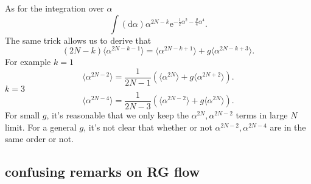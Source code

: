 As for the integration over $\alpha$
\[
	\int (\mathrm{d}\alpha) \alpha^{2N - k} \mathrm{e}^{- \frac{1}{2} \alpha^2 - \frac{g}{4} \alpha^4}
.\] 
The same trick allows us to derive that
\[
	(2N-k) \langle \alpha^{2N-k-1}\rangle = \langle \alpha^{2N-k + 1} \rangle + g \langle \alpha^{2N-k+3} \rangle
.\] 
For example $k=1$
\[
	\langle \alpha^{2N-2} \rangle = \frac{1}{2N-1} (\langle \alpha^{2N} \rangle + g \langle \alpha^{2N+2}\rangle)
.\] 
$k=3$
\[
	\langle \alpha^{2N-4} \rangle = \frac{1}{2N-3}(\langle \alpha^{2N-2} \rangle + g \langle \alpha^{2N} \rangle)
.\] 
For small $g$, it's reasonable that we only keep the $\alpha^{2N},\alpha^{2N-2}$ terms in large $N$ limit.
For a general $g$, it's not clear that whether or not $\alpha^{2N-2},\alpha^{2N-4}$ are in the same order or not.

\subsection{confusing remarks on RG flow}

